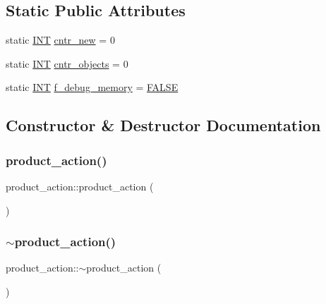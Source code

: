 \subsection*{Static Public Attributes}
\begin{DoxyCompactItemize}
\item 
static \mbox{\hyperlink{galois_8h_a09fddde158a3a20bd2dcadb609de11dc}{I\+NT}} \mbox{\hyperlink{classproduct__action_ab8ca959eea3be77b534221f08f452c2d}{cntr\+\_\+new}} = 0
\item 
static \mbox{\hyperlink{galois_8h_a09fddde158a3a20bd2dcadb609de11dc}{I\+NT}} \mbox{\hyperlink{classproduct__action_a27dda08daecb3d76a7a136318ab5d141}{cntr\+\_\+objects}} = 0
\item 
static \mbox{\hyperlink{galois_8h_a09fddde158a3a20bd2dcadb609de11dc}{I\+NT}} \mbox{\hyperlink{classproduct__action_a3a59e72914ec87b5cd7b8d93ee5d2b66}{f\+\_\+debug\+\_\+memory}} = \mbox{\hyperlink{nauty_8h_aa93f0eb578d23995850d61f7d61c55c1}{F\+A\+L\+SE}}
\end{DoxyCompactItemize}


\subsection{Constructor \& Destructor Documentation}
\mbox{\label{classproduct__action_abdcf790efa2de925d1ba0eef9848b262}} 
\subsubsection{\texorpdfstring{product\+\_\+action()}{product\_action()}}
{\footnotesize\ttfamily product\+\_\+action\+::product\+\_\+action (\begin{DoxyParamCaption}{ }\end{DoxyParamCaption})}

\mbox{\label{classproduct__action_aa5fb126203c10f2559805ff1567d2dbc}} 
\subsubsection{\texorpdfstring{$\sim$product\+\_\+action()}{~product\_action()}}
{\footnotesize\ttfamily product\+\_\+action\+::$\sim$product\+\_\+action (\begin{DoxyParamCaption}{ }\end{DoxyParamCaption})}



